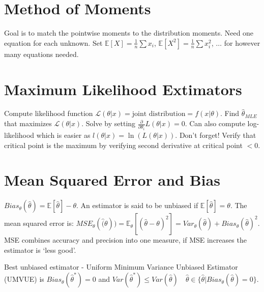 \documentclass[10pt]{article}
\begin{document}
\section{Method of Moments}
Goal is to match the pointwise moments to the distribution moments.
Need one equation for each unknown.
Set $\mathbb{E}[X] = \frac{1}{n} \sum x_i$, $\mathbb{E}[X^2] = \frac{1}{n} \sum x_i ^2$, $\dots$ for however many equations needed.

\section{Maximum Likelihood Extimators}
Compute likelihood function $\mathcal{L}(\theta | x) = \text{joint distribution} = f(x | \theta)$.
Find $\hat{\theta}_{MLE}$ that maximizes $\mathcal{L}(\theta | x)$. 
Solve by setting $\frac{\partial }{ \partial \theta_i} L(\theta | x) = 0$.
Can also compute log-likelihood which is easier as $l(\theta | x) = \ln (L(\theta | x))$.
Don't forget! Verify that critical point is the maximum by verifying second derivative at critical point $< 0$.

\section{Mean Squared Error and Bias}
$Bias_\theta(\hat{\theta}) = \mathbb{E}[\hat{\theta}] - \theta$.
An estimator is said to be unbiased if $\mathbb{E}[\hat{\theta}] = \theta$.
The mean squared error is: 
$MSE_\theta(\hat(\theta)) = \mathbb{E}_\theta[(\hat{\theta} - \theta)^2] = Var_\theta(\hat{\theta}) + Bias_\theta(\hat{\theta})^2$.
MSE combines accuracy and precision into one measure, if MSE increases the estimator is `less good'.

Best unbiased estimator - Uniform Minimum Variance Unbiased Estimator (UMVUE) is $Bias_\theta (\hat{\theta}^*) = 0$ and 
$Var(\hat{\theta}^*) \leq Var(\hat{\theta}) \quad \hat{\theta} \in \{ \hat{\theta} | Bias_\theta(\hat{\theta}) = 0 \}$.
\end{document}
